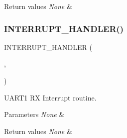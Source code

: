 \begin{DoxyRetVals}{Return values}
{\em None} & \\
\hline
\end{DoxyRetVals}
\mbox{\label{group___debug_port_ga4e16b99949f99738aeeb1d2d62db1cbc}} 
\subsubsection{\texorpdfstring{I\+N\+T\+E\+R\+R\+U\+P\+T\+\_\+\+H\+A\+N\+D\+L\+E\+R()}{INTERRUPT\_HANDLER()}\hspace{0.1cm}{\footnotesize\ttfamily [2/2]}}
{\footnotesize\ttfamily I\+N\+T\+E\+R\+R\+U\+P\+T\+\_\+\+H\+A\+N\+D\+L\+ER (\begin{DoxyParamCaption}\item[{U\+A\+R\+T1\+\_\+\+R\+X\+\_\+\+I\+R\+Q\+Handler}]{,  }\item[{18}]{ }\end{DoxyParamCaption})}



U\+A\+R\+T1 RX Interrupt routine. 


\begin{DoxyParams}{Parameters}
{\em None} & \\
\hline
\end{DoxyParams}

\begin{DoxyRetVals}{Return values}
{\em None} & \\
\hline
\end{DoxyRetVals}
